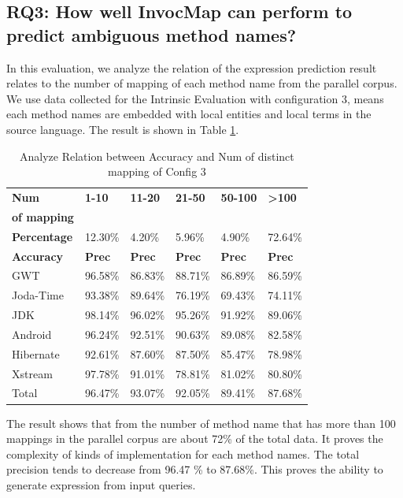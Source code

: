 \subsection{RQ3: How well InvocMap can perform to predict ambiguous method names?}

In this evaluation, we analyze the relation of the expression prediction result relates to the number of mapping of each method name from the parallel corpus. We use data collected for the Intrinsic Evaluation with configuration 3, means each method names are embedded with local entities and local terms in the source language. The result is shown in Table \ref{tbl:Analyze1}.

\begin{table}[]
\small
\caption{Analyze Relation between Accuracy and Num of distinct mapping of Config 3}
\begin{tabular}{|l|l|l|l|l|l|}
\hline
              
\textbf{Num }& \textbf{1-10}        & \textbf{11-20}       & \textbf{21-50}       & \textbf{50-100}      & \textbf{\textgreater{}100}     \\
\textbf{of mapping }&         &        &        &       &      \\ \hline
\textbf{Percentage  }   & 12.30\%     & 4.20\%      & 5.96\%      & 4.90\%      & 72.64\%               \\ \hline
\textbf{Accuracy }      & \textbf{Prec}        & \textbf{Prec}        & \textbf{Prec}        & \textbf{Prec}        & \textbf{Prec}                  \\ \hline
GWT            & 96.58\%     & 86.83\%     & 88.71\%     & 86.89\%     & 86.59\%               \\ \hline
Joda-Time      & 93.38\%     & 89.64\%     & 76.19\%     & 69.43\%     & 74.11\%               \\ \hline
JDK            & 98.14\%     & 96.02\%     & 95.26\%     & 91.92\%     & 89.06\%               \\ \hline
Android        & 96.24\%     & 92.51\%     & 90.63\%     & 89.08\%     & 82.58\%               \\ \hline
Hibernate      & 92.61\%     & 87.60\%     & 87.50\%     & 85.47\%     & 78.98\%               \\ \hline
Xstream        & 97.78\%     & 91.01\%     & 78.81\%     & 81.02\%     & 80.80\%               \\ \hline
Total          & 96.47\%     & 93.07\%     & 92.05\%     & 89.41\%     & 87.68\%               \\ \hline
\end{tabular}

\label{tbl:Analyze1}
\end{table}
The result shows that from the number of method name that has more than 100 mappings in the parallel corpus are about 72\% of the total data. It proves the complexity of kinds of implementation for each method names. The total precision tends to decrease from 96.47 \% to 87.68\%. This proves the ability to generate expression from input queries.





